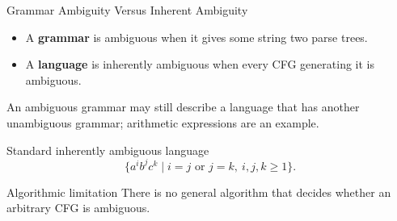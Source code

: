 \documentclass[10pt]{beamer}
\begin{document}
\begin{frame}{Grammar Ambiguity Versus Inherent Ambiguity}
  \begin{itemize}
    \item A \textbf{grammar} is ambiguous when it gives some string two parse trees.
    \item A \textbf{language} is inherently ambiguous when every CFG generating it is ambiguous.
  \end{itemize}
  An ambiguous grammar may still describe a language that has another unambiguous grammar; arithmetic
  expressions are an example.
  \begin{block}{Standard inherently ambiguous language}
    \[
      \{a^i b^j c^k\mid i=j\text{ or }j=k,\ i,j,k\ge1\}.
    \]
  \end{block}
  \begin{alertblock}{Algorithmic limitation}
    There is no general algorithm that decides whether an arbitrary CFG is ambiguous.
  \end{alertblock}
\end{frame}
\end{document}
